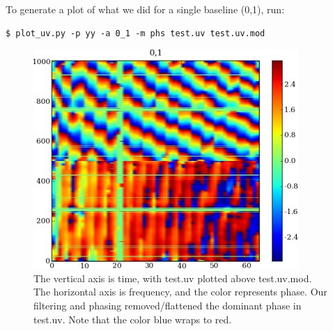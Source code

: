 To generate a plot of what we did for a single baseline (0,1), run:
\begin{verbatim}
$ plot_uv.py -p yy -a 0_1 -m phs test.uv test.uv.mod
\end{verbatim}

\begin{figure}
\begin{center}
\includegraphics[scale=.5]{plot_test_uv.jpg}
\caption{The vertical axis is time, with test.uv plotted above test.uv.mod.
The horizontal axis is frequency, and the color represents phase.  
Our filtering and phasing removed/flattened the dominant phase in test.uv.
Note that the color blue wraps to red.}
\end{center}
\end{figure}


